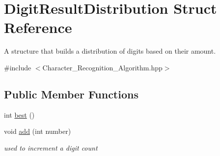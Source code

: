 \hypertarget{struct_digit_result_distribution}{}\section{Digit\+Result\+Distribution Struct Reference}
\label{struct_digit_result_distribution}


A structure that builds a distribution of digits based on their amount.  




{\ttfamily \#include $<$Character\+\_\+\+Recognition\+\_\+\+Algorithm.\+hpp$>$}

\subsection*{Public Member Functions}
\begin{DoxyCompactItemize}
\item 
int \mbox{\hyperlink{struct_digit_result_distribution_a51eaca67148d243afb838b8d93aa6362}{best}} ()
\item 
\mbox{\label{struct_digit_result_distribution_a00f633f47446eae9ce2815bfb4d8bc19}} 
void \mbox{\hyperlink{struct_digit_result_distribution_a00f633f47446eae9ce2815bfb4d8bc19}{add}} (int number)
\begin{DoxyCompactList}\small\item\em used to increment a digit count \end{DoxyCompactList}\end{DoxyCompactItemize}
